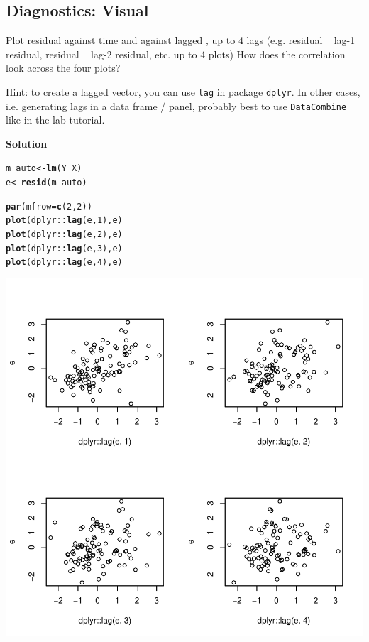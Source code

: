 \documentclass{article}\usepackage[]{graphicx}\usepackage[]{color}
\makeatletter
\def\maxwidth{ %
  \ifdim\Gin@nat@width>\linewidth
    \linewidth
  \else
    \Gin@nat@width
  \fi
}
\newcommand{\hlnum}[1]{\textcolor[rgb]{0.686,0.059,0.569}{#1}}%
\newcommand{\hlopt}[1]{\textcolor[rgb]{0,0,0}{#1}}%
\newcommand{\hlstd}[1]{\textcolor[rgb]{0.345,0.345,0.345}{#1}}%
\newcommand{\hlkwb}[1]{\textcolor[rgb]{0.69,0.353,0.396}{#1}}%
\newcommand{\hlkwc}[1]{\textcolor[rgb]{0.333,0.667,0.333}{#1}}%
\newcommand{\hlkwd}[1]{\textcolor[rgb]{0.737,0.353,0.396}{\textbf{#1}}}%
\newenvironment{kframe}{%
 \def\at@end@of@kframe{}%
 \ifinner\ifhmode%
  \def\at@end@of@kframe{\end{minipage}}%
  \begin{minipage}{\columnwidth}%
 \fi\fi%
 \def\FrameCommand##1{\hskip\@totalleftmargin \hskip-\fboxsep
 \colorbox{shadecolor}{##1}\hskip-\fboxsep
     \hskip-\linewidth \hskip-\@totalleftmargin \hskip\columnwidth}%
 \MakeFramed {\advance\hsize-\width
   \@totalleftmargin\z@ \linewidth\hsize
   \@setminipage}}%
 {\par\unskip\endMakeFramed%
 \at@end@of@kframe}
\newenvironment{knitrout}{}{} %
\makeatother
\begin{document}
\subsection{Diagnostics: Visual}

Plot residual against time and against lagged , up to 4 lags (e.g. residual ~ lag-1 residual, residual ~ lag-2 residual, etc. up to 4 plots) How does the correlation look across the four plots?

Hint: to create a lagged vector, you can use \verb`lag` in package \verb`dplyr`. In other cases, i.e. generating lags in a data frame / panel, probably best to use \verb`DataCombine` like in the lab tutorial.

\textbf{Solution}

\begin{knitrout}
\color{fgcolor}\begin{kframe}
\begin{alltt}
\hlstd{m_auto} \hlkwb{<-} \hlkwd{lm}\hlstd{(Y} \hlopt{~} \hlstd{X)}
\hlstd{e} \hlkwb{<-} \hlkwd{resid}\hlstd{(m_auto)}

\hlkwd{par}\hlstd{(}\hlkwc{mfrow} \hlstd{=} \hlkwd{c}\hlstd{(}\hlnum{2}\hlstd{,} \hlnum{2}\hlstd{))}
\hlkwd{plot}\hlstd{(dplyr}\hlopt{::}\hlkwd{lag}\hlstd{(e,} \hlnum{1}\hlstd{), e)}
\hlkwd{plot}\hlstd{(dplyr}\hlopt{::}\hlkwd{lag}\hlstd{(e,} \hlnum{2}\hlstd{), e)}
\hlkwd{plot}\hlstd{(dplyr}\hlopt{::}\hlkwd{lag}\hlstd{(e,} \hlnum{3}\hlstd{), e)}
\hlkwd{plot}\hlstd{(dplyr}\hlopt{::}\hlkwd{lag}\hlstd{(e,} \hlnum{4}\hlstd{), e)}
\end{alltt}
\end{kframe}
\includegraphics[width=\maxwidth]{figure/unnamed-chunk-2-1} 

\end{knitrout}
\end{document}
